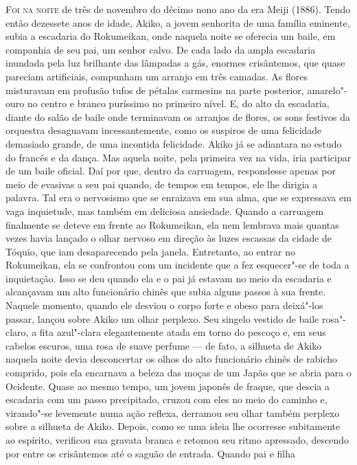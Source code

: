 \noindent\textsc{Foi na noite} de três de novembro do décimo nono ano da era Meiji (1886).
Tendo então dezessete anos de idade, Akiko, a jovem senhorita de uma
família eminente, subia a escadaria do Rokumeikan, onde naquela noite
se oferecia um baile, em companhia de seu pai, um senhor calvo. De cada
lado da ampla escadaria inundada pela luz brilhante das lâmpadas a gás,
enormes crisântemos, que quase pareciam artificiais, compunham um
arranjo em três camadas. As flores misturavam em profusão tufos de
pétalas carmesins na parte posterior, amarelo"-ouro no centro e branco
puríssimo no primeiro nível. E, do alto da escadaria, diante do salão
de baile onde terminavam os arranjos de flores, os sons festivos da
orquestra desaguavam incessantemente, como os suspiros de uma
felicidade demasiado grande, de uma incontida felicidade. Akiko já se
adiantara no estudo do francês e da dança. Mas aquela noite, pela
primeira vez na vida, iria participar de um baile oficial. Daí por que,
dentro da carruagem, respondesse apenas por meio de evasivas a seu pai
quando, de tempos em tempos, ele lhe dirigia a palavra. Tal era o
nervosismo que se enraizava em sua alma, que se expressava em vaga
inquietude, mas também em deliciosa ansiedade. Quando a carruagem
finalmente se deteve em frente ao Rokumeikan, ela nem lembrava mais
quantas vezes havia lançado o olhar nervoso em direção às luzes
escassas da cidade de Tóquio, que iam desaparecendo pela janela.
Entretanto, ao entrar no Rokumeikan, ela se confrontou com um incidente
que a fez esquecer"-se de toda a inquietação. Isso se deu quando ela e o
pai já estavam no meio da escadaria e alcançavam um alto funcionário
chinês que subia alguns passos à sua frente. Naquele momento, quando
ele desviou o corpo forte e obeso para deixá"-los passar, lançou sobre
Akiko um olhar perplexo. Seu singelo vestido de baile rosa"-claro, a
fita azul"-clara elegantemente atada em torno do pescoço e, em seus
cabelos escuros, uma rosa de suave perfume --- de fato, a silhueta de
Akiko naquela noite devia desconcertar os olhos do alto funcionário
chinês de rabicho comprido, pois ela encarnava a beleza das moças de um
Japão que se abria para o Ocidente. Quase ao mesmo tempo, um jovem
japonês de fraque, que descia a escadaria com um passo precipitado,
cruzou com eles no meio do caminho e, virando"-se levemente numa ação
reflexa, derramou seu olhar também perplexo sobre a silhueta de Akiko.
Depois, como se uma ideia lhe ocorresse subitamente ao espírito,
verificou sua gravata branca e retomou seu ritmo apressado, descendo
por entre os crisântemos até o saguão de entrada. Quando pai e filha

